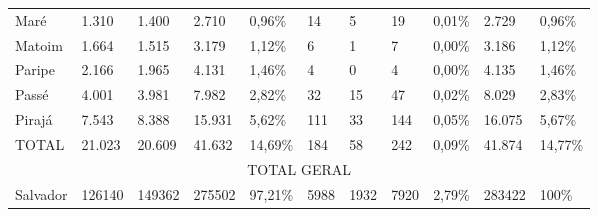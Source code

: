 \begin{table}[!htp]
{\begin{tiny}
\begin{tabular}{m{1.3cm} m{1cm} m{1cm} m{1.1cm}  m{1cm} m{0.7cm} m{0.7cm} m{1.1cm} m{1cm} m{1cm} m{1cm} }
Maré	&1.310	&1.400	&2.710	&0,96\%	&14	&5	&19	&0,01\%	&2.729	&0,96\% \\
Matoim	&1.664	&1.515	&3.179	&1,12\%	&6	&1	&7	&0,00\%	&3.186	&1,12\% \\
Paripe	&2.166	&1.965	&4.131	&1,46\%	&4	&0	&4	&0,00\%	&4.135	&1,46\% \\
Passé	&4.001	&3.981	&7.982	&2,82\%	&32	&15	&47	&0,02\%	&8.029	&2,83\% \\
Pirajá	&7.543	&8.388	&15.931	&5,62\%	&111	&33	&144	&0,05\%	&16.075	&5,67\% \\
TOTAL	&21.023	&20.609	&41.632	&14,69\%	&184	&58	&242	&0,09\%	&41.874	&14,77\% \\
\hline
\multicolumn{11}{c}{TOTAL GERAL} \\
\hline
Salvador	&126140	&149362	&275502	&97,21\%	&5988	&1932	&7920	&2,79\%	&283422	&100\% \\
\hline
\end{tabular} 
\end{tiny}
}
{  }
\end{table}